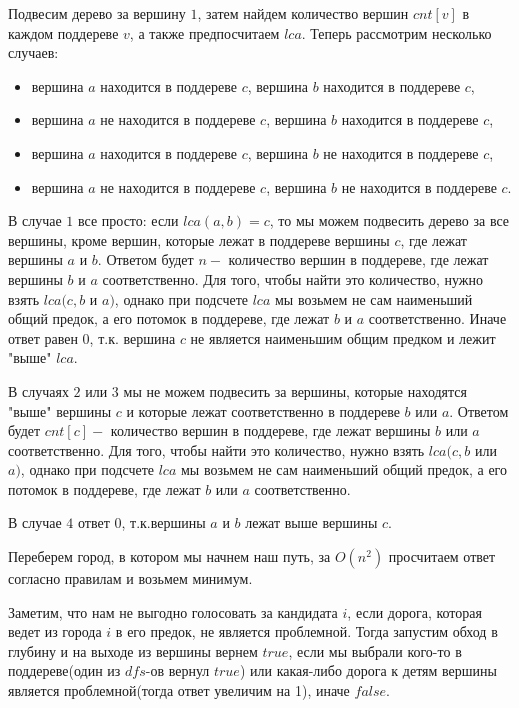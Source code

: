 \documentclass[12pt]{article}
\begin{document}

Подвесим дерево за вершину $1$, затем найдем количество вершин $cnt[v]$ в каждом поддереве $v$, а также предпосчитаем $lca$.
Теперь рассмотрим несколько случаев:
\begin{itemize}
	\item вершина $a$ находится в поддереве $c$, вершина $b$ находится в поддереве $c$,
	\item вершина $a$ не находится в поддереве $c$, вершина $b$ находится в поддереве $c$,
	\item вершина $a$ находится в поддереве $c$, вершина $b$ не находится в поддереве $c$,
	\item вершина $a$ не находится в поддереве $c$, вершина $b$ не находится в поддереве $c$.
\end{itemize}

В случае $1$ все просто: если $lca(a, b) = c$, то мы можем подвесить дерево за все
вершины, кроме вершин, которые лежат в поддереве вершины $c$, где лежат вершины $a$ и $b$.
Ответом будет $n -$ количество вершин в поддереве, где лежат вершины $b$ и $a$ соответственно. Для того, чтобы найти это количество, нужно
взять $lca(c, b$ и $a)$, однако при подсчете $lca$ мы возьмем не сам наименьший общий предок, а его потомок в поддереве, где лежат $b$ и $a$ соответственно.
Иначе ответ равен $0$, т.к. вершина $c$ не является наименьшим общим предком и лежит "выше" $lca$.

В случаях $2$ или $3$ мы не можем подвесить за вершины, которые находятся "выше" вершины $c$ и которые лежат соответственно в поддереве $b$ или $a$.
Ответом будет $cnt[c] -$ количество вершин в поддереве, где лежат вершины $b$ или $a$ соответственно. Для того, чтобы найти это количество, нужно
взять $lca(c, b$ или $a)$, однако при подсчете $lca$ мы возьмем не сам наименьший общий предок, а его потомок в поддереве, где лежат $b$ или $a$ соответственно.

В случае $4$ ответ $0$, т.к.вершины $a$ и $b$ лежат выше вершины $c$.

\EndEditorial
{}

Переберем город, в котором мы начнем наш путь, за $O(n^2)$ просчитаем ответ согласно правилам и возьмем минимум.
\EndEditorial
{}

Заметим, что нам не выгодно голосовать за кандидата $i$, если дорога, которая ведет из города $i$ в его предок, не является проблемной.
Тогда запустим обход в глубину и на выходе из вершины вернем $true$, если мы выбрали кого-то в поддереве(один из $dfs$-ов вернул $true$) или какая-либо дорога к детям
вершины является проблемной(тогда ответ увеличим на 1), иначе $false$.

\EndEditorial
\end{document}
